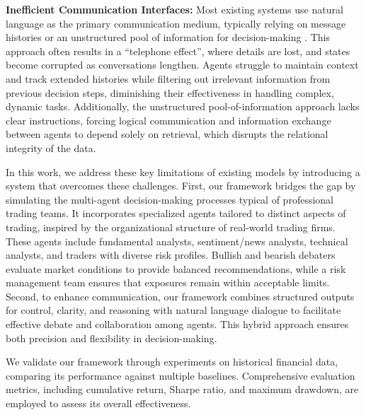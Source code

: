 \textbf{Inefficient Communication Interfaces:} Most existing systems use natural language as the primary communication medium, typically relying on message histories or an unstructured pool of information for decision-making \citep{park2023generativeagentsinteractivesimulacra, qian2024chatdevcommunicativeagentssoftware}. This approach often results in a ``telephone effect'', where details are lost, and states become corrupted as conversations lengthen. Agents struggle to maintain context and track extended histories while filtering out irrelevant information from previous decision steps, diminishing their effectiveness in handling complex, dynamic tasks. Additionally, the unstructured pool-of-information approach lacks clear instructions, forcing logical communication and information exchange between agents to depend solely on retrieval, which disrupts the relational integrity of the data.

In this work, we address these key limitations of existing models by introducing a system that overcomes these challenges. First, our framework bridges the gap by simulating the multi-agent decision-making processes typical of professional trading teams. It incorporates specialized agents tailored to distinct aspects of trading, inspired by the organizational structure of real-world trading firms. These agents include fundamental analysts, sentiment/news analysts, technical analysts, and traders with diverse risk profiles. Bullish and bearish debaters evaluate market conditions to provide balanced recommendations, while a risk management team ensures that exposures remain within acceptable limits. Second, to enhance communication, our framework combines structured outputs for control, clarity, and reasoning with natural language dialogue to facilitate effective debate and collaboration among agents. This hybrid approach ensures both precision and flexibility in decision-making.

We validate our framework through experiments on historical financial data, comparing its performance against multiple baselines. Comprehensive evaluation metrics, including cumulative return, Sharpe ratio, and maximum drawdown, are employed to assess its overall effectiveness.